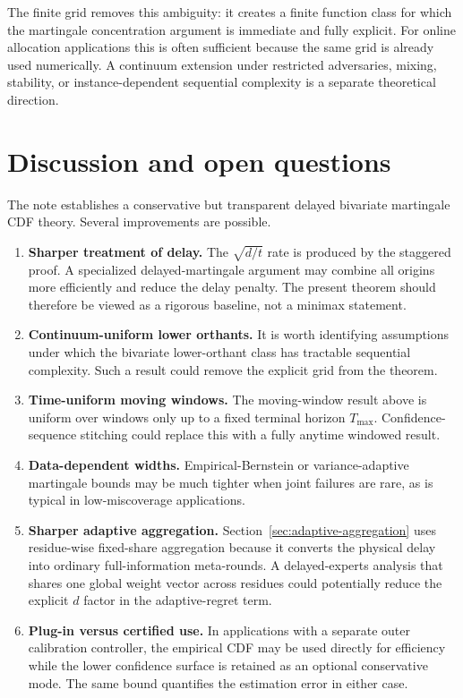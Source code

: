 \documentclass[11pt]{article}
\newcommand{\1}{\mathbf{1}}
\begin{document}
The finite grid removes this ambiguity: it creates a finite function class for
which the martingale concentration argument is immediate and fully explicit.
For online allocation applications this is often sufficient because the same
grid is already used numerically.  A continuum extension under restricted
adversaries, mixing, stability, or instance-dependent sequential complexity is
a separate theoretical direction.

\section{Discussion and open questions}

The note establishes a conservative but transparent delayed bivariate
martingale CDF theory.  Several improvements are possible.

\begin{enumerate}[leftmargin=*]
    \item \textbf{Sharper treatment of delay.}
    The $\sqrt{d/t}$ rate is produced by the staggered proof.  A specialized
    delayed-martingale argument may combine all origins more efficiently and
    reduce the delay penalty.  The present theorem should therefore be viewed
    as a rigorous baseline, not a minimax statement.

    \item \textbf{Continuum-uniform lower orthants.}
    It is worth identifying assumptions under which the bivariate lower-orthant
    class has tractable sequential complexity.  Such a result could remove the
    explicit grid from the theorem.

    \item \textbf{Time-uniform moving windows.}
    The moving-window result above is uniform over windows only up to a fixed
    terminal horizon $T_{\max}$.  Confidence-sequence stitching could replace
    this with a fully anytime windowed result.

    \item \textbf{Data-dependent widths.}
    Empirical-Bernstein or variance-adaptive martingale bounds may be much
    tighter when joint failures are rare, as is typical in low-miscoverage
    applications.

    \item \textbf{Sharper adaptive aggregation.}
    Section~\ref{sec:adaptive-aggregation} uses residue-wise fixed-share
    aggregation because it converts the physical delay into ordinary
    full-information meta-rounds.  A delayed-experts analysis that shares one
    global weight vector across residues could potentially reduce the explicit
    $d$ factor in the adaptive-regret term.

    \item \textbf{Plug-in versus certified use.}
    In applications with a separate outer calibration controller, the empirical
    CDF may be used directly for efficiency while the lower confidence surface
    is retained as an optional conservative mode.  The same bound quantifies
    the estimation error in either case.
\end{enumerate}
\end{document}
